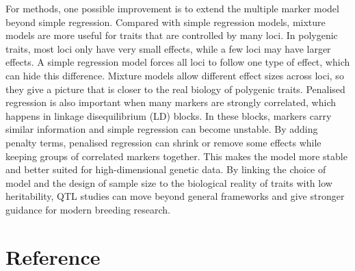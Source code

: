 \documentclass[
  letterpaper,
  DIV=11,
  numbers=noendperiod]{scrartcl}
\begin{document}
For methods, one possible improvement is to extend the multiple marker
model beyond simple regression. Compared with simple regression models,
mixture models are more useful for traits that are controlled by many
loci. In polygenic traits, most loci only have very small effects, while
a few loci may have larger effects. A simple regression model forces all
loci to follow one type of effect, which can hide this difference.
Mixture models allow different effect sizes across loci, so they give a
picture that is closer to the real biology of polygenic traits.
Penalised regression is also important when many markers are strongly
correlated, which happens in linkage disequilibrium (LD) blocks. In
these blocks, markers carry similar information and simple regression
can become unstable. By adding penalty terms, penalised regression can
shrink or remove some effects while keeping groups of correlated markers
together. This makes the model more stable and better suited for
high-dimensional genetic data. By linking the choice of model and the
design of sample size to the biological reality of traits with low
heritability, QTL studies can move beyond general frameworks and give
stronger guidance for modern breeding research.

\section*{Reference}\label{reference}
\end{document}
